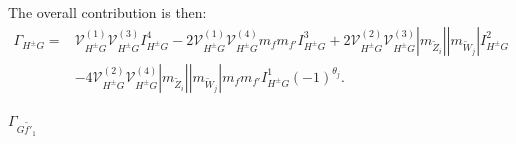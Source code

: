 \documentclass[final,3p,times,pdflatex]{elsarticle}
\begin{document}
The overall contribution is then:
\begin{equation}
\begin{aligned}
\Gamma_{H^{\pm} G} = & \mathcal{V}_{H^{\pm} G}^{(1)}  \mathcal{V}_{H^{\pm} G}^{(3)}  I_{H^{\pm} G}^{4} - 2  \mathcal{V}_{H^{\pm} G}^{(1)}  \mathcal{V}_{H^{\pm} G}^{(4)} m_{f} m_{f'} I_{H^{\pm} G}^{3} + 2  \mathcal{V}_{H^{\pm} G}^{(2)}  \mathcal{V}_{H^{\pm} G}^{(3)}  |m_{\tilde{Z}_i}||m_{\tilde{W}_j}| I_{H^{\pm} G}^{2} \\ & - 4  \mathcal{V}_{H^{\pm} G}^{(2)}  \mathcal{V}_{H^{\pm} G}^{(4)} |m_{\tilde{Z}_i}||m_{\tilde{W}_j}|m_{f} m_{f'} I_{H^{\pm} G}^{1} (-1)^{\theta_j}.
\end{aligned}
\end{equation}


\textbf{\underline{$\Gamma_{G \tilde{f'}_1}$}}
\end{document}
